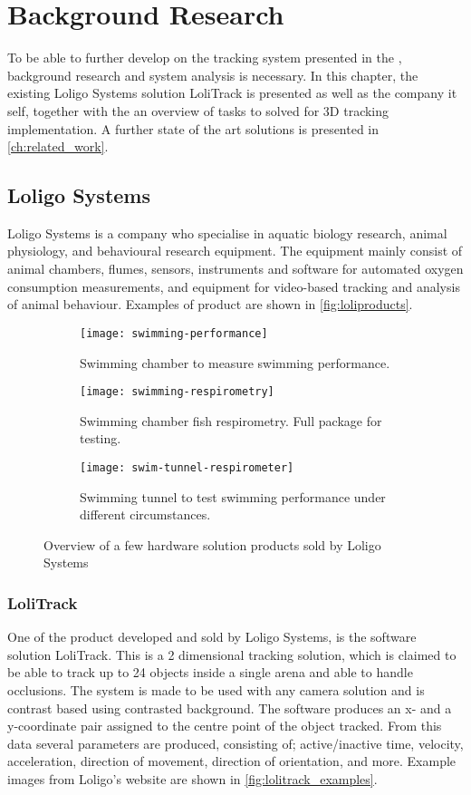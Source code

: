 \graphicspath{{figures/research/}}
\chapter{Background Research}\glsresetall
\label{cha:research}
To be able to further develop on the tracking system presented in the , background research and system analysis is necessary. In this chapter, the existing Loligo Systems solution LoliTrack is presented as well as the company it self, together with the an overview of tasks to solved for 3D tracking implementation. A further state of the art solutions is presented in \autoref{ch:related_work}.

\section{Loligo Systems}
Loligo Systems is a company who specialise in aquatic biology research, animal physiology, and  behavioural research equipment. The equipment mainly consist of animal chambers, flumes, sensors, instruments and software for automated oxygen consumption measurements, and equipment for video-based tracking and analysis of animal behaviour. Examples of product are shown in \autoref{fig:loliproducts}.

\begin{figure}[H]
	\centering
	\begin{subfigure}{0.33\textwidth}
		\texttt{[image: swimming-performance]}
		\caption{Swimming chamber to measure swimming performance.}
	\end{subfigure}
	\begin{subfigure}{0.33\textwidth}
		\texttt{[image: swimming-respirometry]}
		\caption{Swimming chamber fish respirometry. Full package for testing.}
	\end{subfigure}
	\begin{subfigure}{0.32\textwidth}
		\texttt{[image: swim-tunnel-respirometer]}
		\caption{Swimming tunnel to test swimming performance under different circumstances.}
	\end{subfigure}
\caption{Overview of a few hardware solution products sold by Loligo Systems}
\label{fig:loliproducts}
\end{figure}

\subsection{LoliTrack}
One of the product developed and sold by Loligo Systems, is the software solution LoliTrack. This is a 2 dimensional tracking solution, which is claimed to be able to track up to 24 objects inside a single arena and able to handle occlusions. The system is made to be used with any camera solution and is contrast based using contrasted background. The software produces an x- and a y-coordinate pair assigned to the centre point of the object tracked. From this data several parameters are produced, consisting of; active/inactive time, velocity, acceleration, direction of movement, direction of orientation, and more. Example images from Loligo's website are shown in \autoref{fig:lolitrack_examples}.

